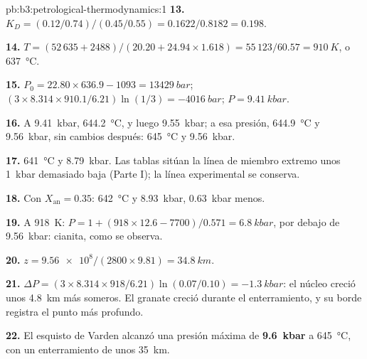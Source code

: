 \begin{solution}{pb:b3:petrological-thermodynamics:1}
\textbf{13.} $K_D = (0.12/0.74)/(0.45/0.55) = 0.1622/0.8182 = 0.198$.

\textbf{14.} $T = (52\,635 + 2488)/(20.20 + 24.94\times1.618) = 55\,123/60.57
= \qty{910}{K}$, o \qty{637}{\celsius}.

\textbf{15.} $P_0 = 22.80\times636.9 - 1093 = \qty{13429}{bar}$; $(3\times8.314
\times910.1/6.21)\ln(1/3) = \qty{-4016}{bar}$; $P = \qty{9.41}{kbar}$.

\textbf{16.} A \qty{9.41}{kbar}, \qty{644.2}{\celsius}, y luego
\qty{9.55}{kbar}; a esa presión, \qty{644.9}{\celsius} y
\qty{9.56}{kbar}, sin cambios después: \qty{645}{\celsius} y
\qty{9.56}{kbar}.

\textbf{17.} \qty{641}{\celsius} y \qty{8.79}{kbar}. Las tablas sitúan la
línea de miembro extremo unos \qty{1}{kbar} demasiado baja (Parte I); la línea experimental
se conserva.

\textbf{18.} Con $X_{\text{an}} = 0.35$: \qty{642}{\celsius} y
\qty{8.93}{kbar}, \qty{0.63}{kbar} menos.

\textbf{19.} A \qty{918}{K}: $P = 1 + (918\times12.6 - 7700)/0.571 =
\qty{6.8}{kbar}$, por debajo de \qty{9.56}{kbar}: cianita, como se observa.

\textbf{20.} $z = \num{9.56e8}/(2800\times9.81) = \qty{34.8}{km}$.

\textbf{21.} $\Delta P = (3\times8.314\times918/6.21)\ln(0.07/0.10) =
\qty{-1.3}{kbar}$: el núcleo creció unos \qty{4.8}{km} más someros. El granate
creció durante el enterramiento, y su borde registra el punto más profundo.

\textbf{22.} El esquisto de Varden alcanzó una presión máxima de
\textbf{\qty[text-series-to-math=true]{9.6}{kbar}} a
\qty{645}{\celsius}, con un enterramiento de unos \qty{35}{km}.
\end{solution}
